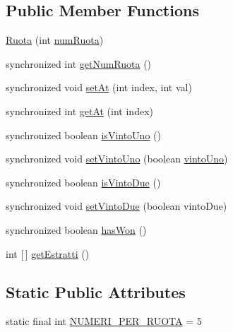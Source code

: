 \subsection*{Public Member Functions}
\begin{DoxyCompactItemize}
\item 
\mbox{\hyperlink{classmain_1_1_ruota_a94f55777c902bce8766a98bb0423b7a0}{Ruota}} (int \mbox{\hyperlink{classmain_1_1_ruota_ab7691d77fe75980e207c3c89cf90b7da}{num\+Ruota}})
\item 
synchronized int \mbox{\hyperlink{classmain_1_1_ruota_a42fe6d0ed82bf794b0956983a6b5f8b2}{get\+Num\+Ruota}} ()
\item 
synchronized void \mbox{\hyperlink{classmain_1_1_ruota_a3debdaf5d71e61062f8c3ac4bfba02b8}{set\+At}} (int index, int val)
\item 
synchronized int \mbox{\hyperlink{classmain_1_1_ruota_a3fbe06494cd4fa2d6fd022c2e84e9156}{get\+At}} (int index)
\item 
synchronized boolean \mbox{\hyperlink{classmain_1_1_ruota_ae2a86522fbeb35b9286bf2a14f663186}{is\+Vinto\+Uno}} ()
\item 
synchronized void \mbox{\hyperlink{classmain_1_1_ruota_a24f43a149e8280c81c9718eada8ece10}{set\+Vinto\+Uno}} (boolean \mbox{\hyperlink{classmain_1_1_ruota_a208227a3e29bd1d579feb423a9948700}{vinto\+Uno}})
\item 
synchronized boolean \mbox{\hyperlink{classmain_1_1_ruota_afd35315bdd4e0c12efd6d410f9573784}{is\+Vinto\+Due}} ()
\item 
synchronized void \mbox{\hyperlink{classmain_1_1_ruota_ab033e20bad03089115af5905cd091752}{set\+Vinto\+Due}} (boolean vinto\+Due)
\item 
synchronized boolean \mbox{\hyperlink{classmain_1_1_ruota_aed75271bb2c21c3cb7e838a2cdc1898a}{has\+Won}} ()
\item 
int \mbox{[}$\,$\mbox{]} \mbox{\hyperlink{classmain_1_1_ruota_a0dee4d8069c9f083fac5bd060b9ae872}{get\+Estratti}} ()
\end{DoxyCompactItemize}
\subsection*{Static Public Attributes}
\begin{DoxyCompactItemize}
\item 
static final int \mbox{\hyperlink{classmain_1_1_ruota_a545c7333f82d918fed8d2a5838c334fd}{N\+U\+M\+E\+R\+I\+\_\+\+P\+E\+R\+\_\+\+R\+U\+O\+TA}} = 5
\end{DoxyCompactItemize}
